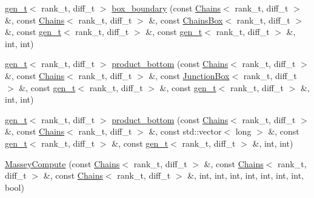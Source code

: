 \begin{DoxyCompactItemize}
\item 
\hyperlink{namespaceMackey_a6bb0b2796632ba6c7f8ea192f7aecffe}{gen\+\_\+t}$<$ rank\+\_\+t, diff\+\_\+t $>$ \hyperlink{structMackey_1_1internal_1_1MasseyCompute_aa62c7436a98f7be7105e6ab0157cb431}{box\+\_\+boundary} (const \hyperlink{classMackey_1_1Chains}{Chains}$<$ rank\+\_\+t, diff\+\_\+t $>$ \&, const \hyperlink{classMackey_1_1Chains}{Chains}$<$ rank\+\_\+t, diff\+\_\+t $>$ \&, const \hyperlink{classMackey_1_1ChainsBox}{Chains\+Box}$<$ rank\+\_\+t, diff\+\_\+t $>$ \&, const \hyperlink{namespaceMackey_a6bb0b2796632ba6c7f8ea192f7aecffe}{gen\+\_\+t}$<$ rank\+\_\+t, diff\+\_\+t $>$ \&, const \hyperlink{namespaceMackey_a6bb0b2796632ba6c7f8ea192f7aecffe}{gen\+\_\+t}$<$ rank\+\_\+t, diff\+\_\+t $>$ \&, int, int)
\item 
\hyperlink{namespaceMackey_a6bb0b2796632ba6c7f8ea192f7aecffe}{gen\+\_\+t}$<$ rank\+\_\+t, diff\+\_\+t $>$ \hyperlink{structMackey_1_1internal_1_1MasseyCompute_a2a7ff03cfeadb4f35c0798bf2a447a7e}{product\+\_\+bottom} (const \hyperlink{classMackey_1_1Chains}{Chains}$<$ rank\+\_\+t, diff\+\_\+t $>$ \&, const \hyperlink{classMackey_1_1Chains}{Chains}$<$ rank\+\_\+t, diff\+\_\+t $>$ \&, const \hyperlink{classMackey_1_1JunctionBox}{Junction\+Box}$<$ rank\+\_\+t, diff\+\_\+t $>$ \&, const \hyperlink{namespaceMackey_a6bb0b2796632ba6c7f8ea192f7aecffe}{gen\+\_\+t}$<$ rank\+\_\+t, diff\+\_\+t $>$ \&, const \hyperlink{namespaceMackey_a6bb0b2796632ba6c7f8ea192f7aecffe}{gen\+\_\+t}$<$ rank\+\_\+t, diff\+\_\+t $>$ \&, int, int)
\item 
\hyperlink{namespaceMackey_a6bb0b2796632ba6c7f8ea192f7aecffe}{gen\+\_\+t}$<$ rank\+\_\+t, diff\+\_\+t $>$ \hyperlink{structMackey_1_1internal_1_1MasseyCompute_a365bc6ba5037727f1ce3d0a1e469f408}{product\+\_\+bottom} (const \hyperlink{classMackey_1_1Chains}{Chains}$<$ rank\+\_\+t, diff\+\_\+t $>$ \&, const \hyperlink{classMackey_1_1Chains}{Chains}$<$ rank\+\_\+t, diff\+\_\+t $>$ \&, const std\+::vector$<$ long $>$ \&, const \hyperlink{namespaceMackey_a6bb0b2796632ba6c7f8ea192f7aecffe}{gen\+\_\+t}$<$ rank\+\_\+t, diff\+\_\+t $>$ \&, const \hyperlink{namespaceMackey_a6bb0b2796632ba6c7f8ea192f7aecffe}{gen\+\_\+t}$<$ rank\+\_\+t, diff\+\_\+t $>$ \&, int, int)
\item 
\hyperlink{structMackey_1_1internal_1_1MasseyCompute_a76235baafddad97e59b165f6ce56fa32}{Massey\+Compute} (const \hyperlink{classMackey_1_1Chains}{Chains}$<$ rank\+\_\+t, diff\+\_\+t $>$ \&, const \hyperlink{classMackey_1_1Chains}{Chains}$<$ rank\+\_\+t, diff\+\_\+t $>$ \&, const \hyperlink{classMackey_1_1Chains}{Chains}$<$ rank\+\_\+t, diff\+\_\+t $>$ \&, int, int, int, int, int, int, int, bool)

\end{DoxyCompactItemize}
